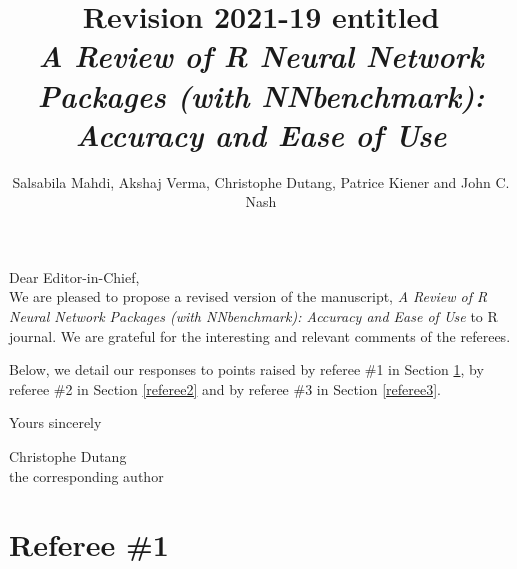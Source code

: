 \documentclass[12pt]{article}
\title{Revision 2021-19 entitled\\ \textsl{A Review of R Neural Network Packages (with NNbenchmark): Accuracy and Ease of Use}}
\author{Salsabila Mahdi, Akshaj Verma, Christophe Dutang, Patrice Kiener and John C. Nash}
\begin{document}
\maketitle

Dear Editor-in-Chief,\\

\noindent We are pleased to propose a revised version of the manuscript, 
\textsl{A Review of R Neural Network Packages (with NNbenchmark): Accuracy and Ease of Use} to R journal. 
We are grateful for the interesting and relevant comments of the referees.

\medskip
Below, we detail our responses to points raised by referee \#1 in Section \ref{referee1},
by referee \#2 in Section \ref{referee2} and by referee \#3 in Section \ref{referee3}.
\medskip

Yours sincerely
\bigskip


Christophe Dutang\\
the corresponding author

 
\newpage
\section{Referee \#1}\label{referee1}
\end{document}
